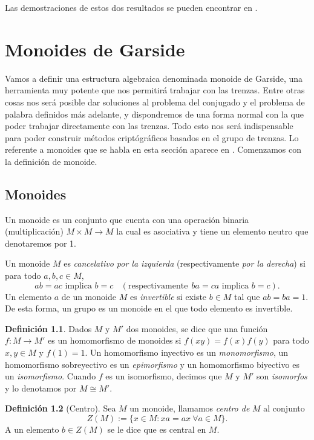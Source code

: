 \documentclass[12pt]{book}
\theoremstyle{definition}
\newtheorem{defi}{Definición}[section]
\begin{document}
Las demostraciones de estos dos resultados se pueden encontrar en \cite{group, alg_abs}.






\chapter{Monoides de Garside}

Vamos a definir una estructura algebraica denominada monoide de Garside, una herramienta muy potente que nos permitirá trabajar con las trenzas. Entre otras cosas nos será posible dar soluciones al problema del conjugado y el problema de palabra definidos más adelante, y dispondremos de una forma normal con la que poder trabajar directamente con las trenzas. Todo esto nos será indispensable para poder construir métodos criptógráficos basados en el grupo de trenzas. Lo referente a monoides que se habla en esta sección aparece en \cite{br_gr}. Comenzamos con la definición de monoide.

\section{Monoides}

Un monoide es un conjunto que cuenta con una operación binaria (multiplicación) $M\times M \rightarrow M$ la cual es asociativa y tiene un elemento neutro que denotaremos por 1. 

Un monoide $M$ es \textit{cancelativo por la izquierda} (respectivamente \textit{por la derecha}) si para todo $a,b,c\in M$,
$$ab=ac\text{ implica } b=c\ \ \ \ (\textrm{respectivamente}\ \  ba=ca \text{ implica } b=c).$$
Un elemento $a$ de un monoide $M$ es \textit{invertible} si existe $b\in M$ tal que $ab=ba=1$. De esta forma, un grupo es un monoide en el que todo elemento es invertible.

\begin{defi}
Dados $M$ y $M'$ dos monoides, se dice que una función $f:M\rightarrow M'$ es un homomorfismo de monoides si $f(xy)=f(x)f(y)$ para todo $x,y\in M$ y $f(1)=1$. Un homomorfismo inyectivo es un \textit{monomorfismo}, un homomorfismo sobreyectivo es un \textit{epimorfismo} y un homomorfismo biyectivo es un \textit{isomorfismo}. Cuando $f$ es un isomorfismo, decimos que $M$ y $M'$ son \textit{isomorfos} y lo denotamos por $M\cong M'$.
\end{defi}

\begin{defi}[Centro]
Sea $M$ un monoide, llamamos \textit{centro de} $M$ al conjunto
$$Z(M):= \{x\in M: xa=ax\ \forall a\in M\}.$$
A un elemento $b\in Z(M)$ se le dice que es central en $M$.
\end{defi}
\end{document}

